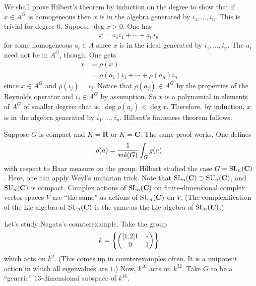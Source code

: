 \documentclass [11 pt, oneside, margin = 1 in] {article}
\begin{document}
We shall prove Hilbert's theorem by induction on the degree to show that if $x\in A^G$ is homogeneous then $x$ is in the algebra generated by $i_1,\hdots,i_n$. This is trivial for degree $0$. Suppose $\deg x > 0$. One has
\begin{align*}
	x=a_1i_1 + \cdots +a_ni_n
\end{align*}
for some homogeneous $a_i\in A$ since $x$ is in the ideal generated by $i_1,\hdots, i_n$. The $a_i$ need not be in $A^G$, though. One gets
\begin{align*}
	x &= \rho(x)\\ 
	  &= \rho(a_1)i_1 + \cdots +\rho(a_n)i_n
\end{align*}
since $x\in A^G$ and $\rho(i_j)=i_j$. Notice that $\rho(a_j) \in A^G$ by the properties of the Reynolds operator and $i_j\in A^G$ by assumption. So $x$ is a polynomial in elements of $A^G$ of smaller degree; that is, $\deg \rho(a_j)<\deg x$. Therefore, by induction, $x$ is in the algebra generated by $i_1,\hdots, i_n$. Hilbert's finiteness theorem follows.

Suppose $G$ is compact and $K=\mathbf{R}$ or $K=\mathbf{C}$. The same proof works. One defines 
\begin{align*}
	\rho(a) = \frac{1}{\operatorname{vol} (G)}\int_{G}^{} g(a) 
\end{align*}		
with respect to Haar measure on the group. Hilbert studied the case $G=\operatorname{SL}_{n}(\mathbf{C})$. Here, one can apply Weyl's unitarian trick. Note that $\operatorname{SL}_{n}(\mathbf{C})\supset \operatorname{SU}_n(\mathbf{C})$, and $\operatorname{SU}_n(\mathbf{C})$ is compact. Complex actions of $\operatorname{SL}_{n}(\mathbf{C})$ on finite-dimensional complex vector spaces $V$ are ``the same'' as actions of $\operatorname{SU}_n(\mathbf{C})$ on $V$. (The complexification of the Lie algebra of $\operatorname{SU}_n(\mathbf{C})$ is the same as the Lie algebra of $\operatorname{SL}_{n}(\mathbf{C})$.) 

Let's study Nagata's counterexample. Take the group
\begin{align*}
	k = \left\{ \begin{pmatrix} [ 1.2 ] 1&*\\0&1\end{pmatrix} \right\} 
\end{align*}
which acts on $k^2$. (This comes up in counterexamples often. It is a unipotent action in which all eigenvalues are $1$.) Now, $k^{16}$ acts on $k^{32}$. Take $G$ to be a ``generic'' $13$-dimensional subspace of $k^{16}$. 
\end{document}
